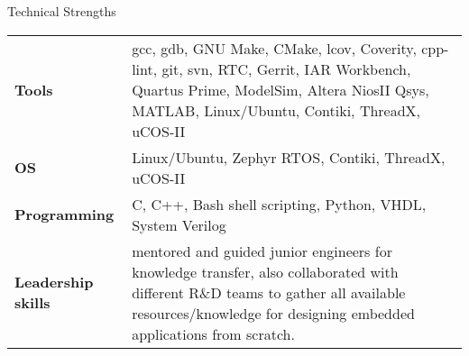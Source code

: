 \documentclass[
	a4paper, %
	11pt, %
]{resume} %
\begin{document}

\begin{rSection}{Technical Strengths}

	\begin{tabular}[t]{m{3cm} m{14cm}}
		\textbf{Tools} & gcc, gdb, GNU Make, CMake, lcov, Coverity, cpp-lint, git, svn, RTC, Gerrit, IAR
Workbench, Quartus Prime, ModelSim, Altera NiosII Qsys, MATLAB, Linux/Ubuntu, Contiki, ThreadX, uCOS-II \\
            \textbf{OS} & Linux/Ubuntu, Zephyr RTOS, Contiki, ThreadX, uCOS-II \\
            \textbf{Programming} & C, C++, Bash shell scripting, Python, VHDL, System Verilog \\
		\textbf{Leadership skills} & mentored and guided junior engineers for knowledge transfer, also collaborated with different R\&D teams to gather all available resources/knowledge for designing embedded applications from scratch.

	\end{tabular}
 
\end{rSection}

\end{document}
